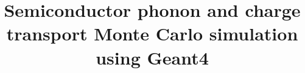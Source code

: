 \documentclass[preprint,12pt]{elsarticle}
\begin{document}
\begin{frontmatter}



\title{Semiconductor phonon and charge transport Monte Carlo simulation using Geant4}


\author{}

\address{}



\begin{keyword}


\end{keyword}

\end{frontmatter}


\section{}
\label{}


\end{document}
